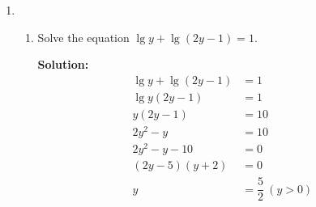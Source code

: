 \documentclass{report}
\newcommand{\sol}{\vspace{0.2cm}\textbf{Solution:}\vspace{0.2cm}}
\begin{document}
\begin{multicols*}{2}
\begin{enumerate}[leftmargin=*]
\begin{enumerate}
                  \item Given that $2 \lg x^2 y=3+\lg x-\lg y$, where $x$ and $y$ are both positive,
                        express, in its simplest form, $y$ in terms of $x$.

                        \sol{}
                        \begin{align*}
                            2 \lg x^2 y & = 3+\lg x-\lg y               \\
                            \lg x^4 y^2 & = \lg \dfrac{1000x}{y}        \\
                            x^4 y^2     & = \dfrac{1000x}{y}            \\
                            x^4 y^3     & = 1000x                       \\
                            y^3         & = \dfrac{1000x}{x^4}          \\
                                        & = \dfrac{1000}{x^3}           \\
                            y           & = \sqrt[3]{\dfrac{1000}{x^3}} \\
                                        & = \dfrac{10}{x}
                        \end{align*}
              \end{enumerate}

        \item \begin{enumerate}
                  \item Solve the equation $\lg y+\lg (2 y-1)=1$.

                        \sol{}
                        \begin{align*}
                            \lg y + \lg (2y-1) & = 1                     \\
                            \lg y(2y-1)        & = 1                     \\
                            y(2y-1)            & = 10                    \\
                            2y^2 - y           & = 10                    \\
                            2y^2 - y - 10      & = 0                     \\
                            (2y-5)(y+2)        & = 0                     \\
                            y                  & = \dfrac{5}{2}\ (y > 0)
                        \end{align*}


\end{enumerate}
\end{enumerate}
\end{multicols*}
\end{document}
